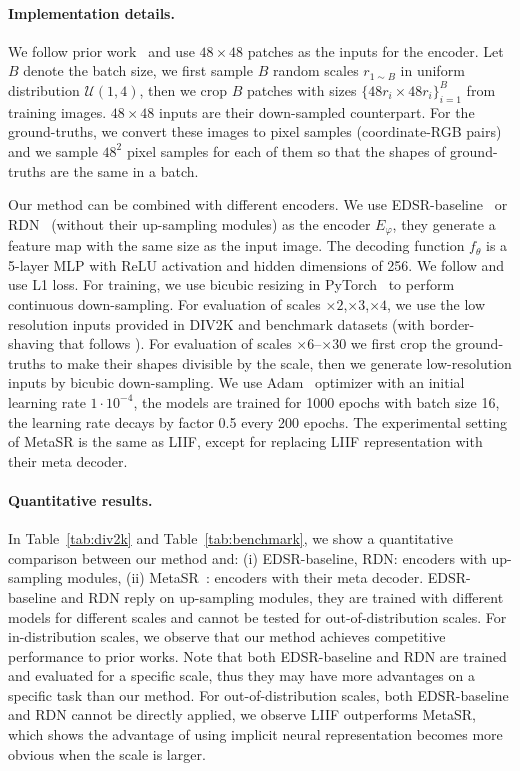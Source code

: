 \documentclass[final]{cvpr}
\begin{document}
\vspace{-1em}
\paragraph{Implementation details.} We follow prior work~\cite{lim2017enhanced} and use $48\times 48$ patches as the inputs for the encoder. Let $B$ denote the batch size, we first sample $B$ random scales $r_{1\sim B}$ in uniform distribution $\mathcal{U}(1, 4)$, then we crop $B$ patches with sizes $\{48 r_i \times 48 r_i\}_{i=1}^B$ from training images. $48\times 48$ inputs are their down-sampled counterpart. For the ground-truths, we convert these images to pixel samples (coordinate-RGB pairs) and we sample $48^2$ pixel samples for each of them so that the shapes of ground-truths are the same in a batch.

Our method can be combined with different encoders. We use EDSR-baseline~\cite{lim2017enhanced} or RDN~\cite{zhang2018residual} (without their up-sampling modules) as the encoder $E_{\varphi}$, they generate a feature map with the same size as the input image. The decoding function $f_{\theta}$ is a 5-layer MLP with ReLU activation and hidden dimensions of 256. We follow \cite{lim2017enhanced} and use L1 loss. For training, we use bicubic resizing in PyTorch~\cite{NEURIPS2019_9015} to perform continuous down-sampling. For evaluation of scales $\times2$,$\times3$,$\times4$, we use the low resolution inputs provided in DIV2K and benchmark datasets (with border-shaving that follows \cite{lim2017enhanced}). For evaluation of scales $\times 6$--$\times 30$ we first crop the ground-truths to make their shapes divisible by the scale, then we generate low-resolution inputs by bicubic down-sampling. We use Adam~\cite{kingma2014adam} optimizer with an initial learning rate $1\cdot 10^{-4}$, the models are trained for 1000 epochs with batch size 16, the learning rate decays by factor 0.5 every 200 epochs. The experimental setting of MetaSR is the same as LIIF, except for replacing LIIF representation with their meta decoder.

\vspace{-1em}
\paragraph{Quantitative results.} In Table~\ref{tab:div2k} and Table~\ref{tab:benchmark}, we show a quantitative comparison between our method and: (i) EDSR-baseline, RDN: encoders with up-sampling modules, (ii) MetaSR~\cite{hu2019meta}: encoders with their meta decoder. EDSR-baseline and RDN reply on up-sampling modules, they are trained with different models for different scales and cannot be tested for out-of-distribution scales. For in-distribution scales, we observe that our method achieves competitive performance to prior works. Note that both EDSR-baseline and RDN are trained and evaluated for a specific scale, thus they may have more advantages on a specific task than our method. For out-of-distribution scales, both EDSR-baseline and RDN cannot be directly applied, we observe LIIF outperforms MetaSR, which shows the advantage of using implicit neural representation becomes more obvious when the scale is larger.
\end{document}
